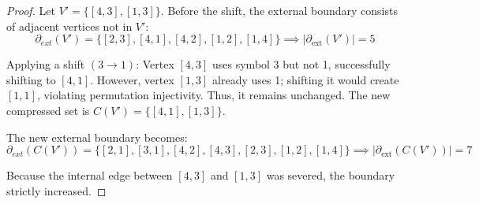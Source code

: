 \documentclass[11pt, letterpaper]{article}
\theoremstyle{definition}
\theoremstyle{remark}
\begin{document}
\begin{proof}
Let $V' = \{[4,3], [1,3]\}$. Before the shift, the external boundary consists of adjacent vertices not in $V'$:
\begin{equation*}
\partial_{ext}(V') = \{[2,3], [4,1], [4,2], [1,2], [1,4]\} \implies \left| \partial_{\mathrm{ext}}(V') \right| = 5
\end{equation*}

Applying a shift $(3 \to 1)$: Vertex $[4,3]$ uses symbol 3 but not 1, successfully shifting to $[4,1]$. However, vertex $[1,3]$ already uses 1; shifting it would create $[1,1]$, violating permutation injectivity. Thus, it remains unchanged. The new compressed set is $C(V') = \{[4,1], [1,3]\}$.

The new external boundary becomes:
\begin{equation*}
\partial_{ext}(C(V')) = \{[2,1], [3,1], [4,2], [4,3], [2,3], [1,2], [1,4]\} \implies \left| \partial_{\mathrm{ext}}(C(V')) \right| = 7
\end{equation*}

Because the internal edge between $[4,3]$ and $[1,3]$ was severed, the boundary strictly increased.
\end{proof}
\end{document}
